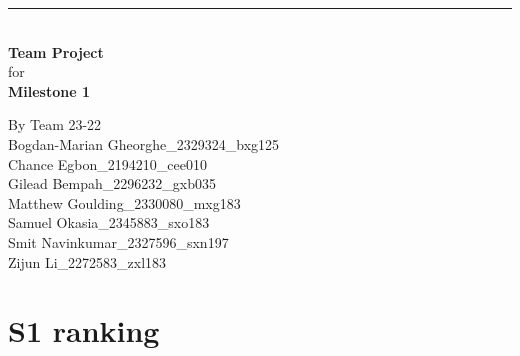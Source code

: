 \documentclass[a4paper]{article}
\begin{document}

\begin{titlepage}
	
	\rule{\linewidth}{5pt}
	\raggedleft
	\fontsize{38pt}{50pt}\selectfont
    \textbf{\\Team Project\\}
    \fontsize{28pt}{60pt}\selectfont 
    for\\
    \fontsize{38pt}{60pt}\selectfont 
    \textbf{Milestone 1\\}
	
	\vfill %
	
	
	\parbox[t]{0.93\textwidth}{ %
		\raggedleft %
		\large %
		{\Large By Team 23-22}\\[4pt] %
		Bogdan-Marian Gheorghe\_2329324\_bxg125\\
		Chance Egbon\_2194210\_cee010\\
		Gilead Bempah\_2296232\_gxb035\\
		Matthew Goulding\_2330080\_mxg183\\
		Samuel Okasia\_2345883\_sxo183\\
		Smit Navinkumar\_2327596\_sxn197\\
		Zijun Li\_2272583\_zxl183\\
	}
	
\end{titlepage}

\begin{center}
	\tableofcontents
\end{center}
\newpage

\section{S1 ranking}
\end{document}
